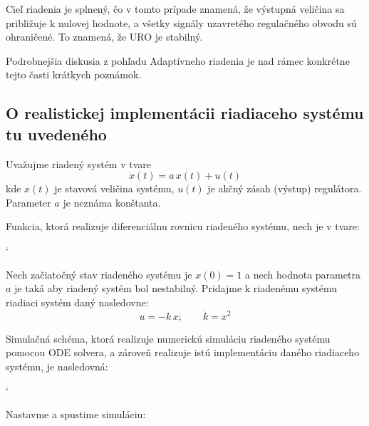 \documentclass[a4paper, 10pt, ]{article}
\begin{document}
\noindent
Cieľ riadenia je splnený, čo v tomto prípade znamená, že výstupná veličina sa približuje k nulovej hodnote, a všetky signály uzavretého regulačného obvodu sú ohraničené. To znamená, že URO je stabilný.

Podrobnejšia diskusia z pohľadu Adaptívneho riadenia je nad rámec konkrétne tejto časti krátkych poznámok.














\subsection{O realistickej implementácii riadiaceho systému tu uvedeného}


Uvažujme riadený systém v tvare
\begin{equation}
	\dot{x}(t) = a\, x(t) + u(t)
\end{equation}
kde $x(t)$ je stavová veličina systému, $u(t)$ je akčný zásah (výstup) regulátora. Parameter $a$ je neznáma konštanta.

Funkcia, ktorá realizuje diferenciálnu rovnicu riadeného systému, nech je v tvare:


{\catcode`

}

Nech začiatočný stav riadeného systému je $x(0) = 1$ a nech hodnota parametra $a$ je taká aby riadený systém bol nestabilný. Pridajme k riadenému systému riadiaci systém daný nasledovne:
\begin{equation}
	u = -k\, x; \qquad \dot{k} = x^2
\end{equation}


Simulačná schéma, ktorá realizuje numerickú simuláciu riadeného systému pomocou ODE solvera, a zároveň realizuje istú implementáciu daného riadiaceho systému, je nasledovná:


{\catcode`

}

\noindent
Nastavme a spustime simuláciu:
\end{document}
